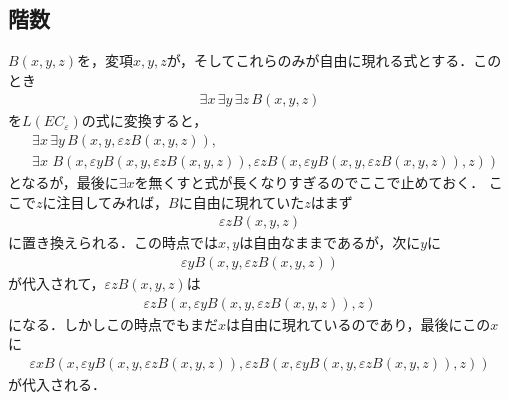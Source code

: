 \subsection{階数}
	$B(x,y,z)$を，変項$x,y,z$が，そしてこれらのみが自由に現れる式とする．このとき
	\begin{align}
		\exists x\, \exists y\, \exists z\, B(x,y,z)
	\end{align}
	を$L(EC_{\varepsilon})$の式に変換すると，
	\begin{align}
		&\exists x\, \exists y\, B(x,y,\varepsilon z B(x,y,z)), \\
		&\exists x\, \, B(x,\varepsilon y B(x,y,\varepsilon z B(x,y,z)),\varepsilon z B(x,\varepsilon y B(x,y,\varepsilon z B(x,y,z)),z))
	\end{align}
	となるが，最後に$\exists x$を無くすと式が長くなりすぎるのでここで止めておく．
	ここで$z$に注目してみれば，$B$に自由に現れていた$z$はまず
	\begin{align}
		\varepsilon z B(x,y,z)
	\end{align}
	に置き換えられる．この時点では$x,y$は自由なままであるが，次に$y$に
	\begin{align}
		\varepsilon y B(x,y,\varepsilon z B(x,y,z))
	\end{align}
	が代入されて，$\varepsilon z B(x,y,z)$は
	\begin{align}
		\varepsilon z B(x,\varepsilon y B(x,y,\varepsilon z B(x,y,z)),z)
	\end{align}
	になる．しかしこの時点でもまだ$x$は自由に現れているのであり，最後にこの$x$に
	\begin{align}
		\varepsilon x B(x,\varepsilon y B(x,y,\varepsilon z B(x,y,z)),\varepsilon z B(x,\varepsilon y B(x,y,\varepsilon z B(x,y,z)),z))
	\end{align}
	が代入される．
	
